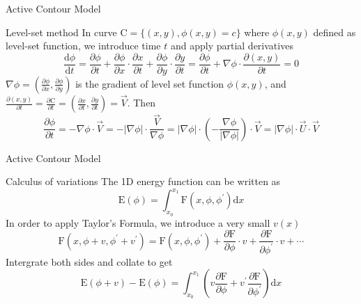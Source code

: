 \begin{frame}{Active Contour Model}
	\begin{block}{Level-set method}
		In curve $\mathrm{C}=\{(x,y),\phi(x,y)=c\}$ where $\phi(x,y)$ defined as level-set function, we introduce time $t$ and apply partial derivatives
		\begin{equation}
			\frac{\mathrm{d} \phi}{\mathrm{d} t}=\frac{\partial \phi}{\partial t}+\frac{\partial \phi}{\partial x}\cdot\frac{\partial x}{\partial t}+\frac{\partial \phi}{\partial y}\cdot\frac{\partial y}{\partial t}=\frac{\partial \phi}{\partial t}+\nabla\phi\cdot\frac{\partial (x,y)}{\partial t}=0
		\end{equation}
		$\nabla\phi=(\frac{\partial \phi}{\partial x},\frac{\partial \phi}{\partial y})$ is the gradient of level set function $\phi(x,y)$, and $\frac{\partial (x,y)}{\partial t}=\frac{\partial \mathrm{C}}{\partial t}=(\frac{\partial x}{\partial t},\frac{\partial y}{\partial t})=\vec{V}$. Then
		\begin{equation}
			\frac{\partial \phi}{\partial t}=-\nabla \phi \cdot \vec{V}=-|\nabla \phi| \cdot \frac{\vec{V}}{\nabla \phi}=|\nabla \phi| \cdot\left(-\frac{\nabla \phi}{|\nabla \phi|}\right) \cdot \vec{V}=|\nabla \phi| \cdot \vec{U} \cdot \vec{V}
		\end{equation}
	\end{block}
\end{frame}

\begin{frame}{Active Contour Model}
	\begin{block}{Calculus of variations}
		The 1D energy function can be written as
		\begin{equation}
			\mathrm{E}(\phi)=\int_{x_0}^{x_1}\mathrm{F}(x,\phi,\phi^\prime)\mathrm{d}x
		\end{equation}
		In order to apply Taylor's Formula, we introduce a very small $v(x)$
		\begin{equation}
			\mathrm{F}(x,\phi+v,\phi^\prime+v^\prime)=\mathrm{F}(x,\phi,\phi^\prime)+\frac{\partial \mathrm{F}}{\partial \phi}\cdot v+\frac{\partial \mathrm{F}}{\partial \phi^\prime}\cdot v+\cdots
		\end{equation}
		Intergrate both sides and collate to get
		\begin{equation}
			\mathrm{E}(\phi+v)-\mathrm{E}(\phi)=\int_{x_0}^{x_1}\left(v \frac{\partial \mathrm{F}}{\partial \phi}+v^{\prime} \frac{\partial \mathrm{F}}{\partial \phi^{\prime}}\right) \mathrm{d} x
		\end{equation}
	\end{block}
\end{frame}

